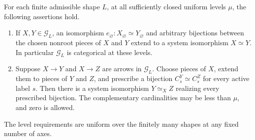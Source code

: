 \begin{theorem}
\label{sys:basis-classification}
For each finite admissible shape $L$, at all sufficiently closed
uniform levels $\mu$, the following assertions hold.
\begin{enumerate}
\item If $X,Y\in\mathcal G_L$, an isomorphism
$e_\varnothing:X_\varnothing\simeq Y_\varnothing$ and arbitrary
bijections between the chosen nonroot pieces of $X$ and $Y$ extend
to a system isomorphism $X\simeq Y$.
In particular $\mathcal G_L$ is categorical at these levels.
\item Suppose $X\to Y$ and $X\to Z$ are arrows in
$\mathcal G_L$.  Choose pieces of $X$, extend them to pieces of
$Y$ and $Z$, and prescribe a bijection
$C_s^Y\simeq C_s^Z$ for every active label $s$.
Then there is a system isomorphism $Y\simeq_X Z$ realizing every
prescribed bijection.  The complementary cardinalities may be
less than $\mu$, and zero is allowed.
\end{enumerate}
The level requirements are uniform over the finitely many shapes
at any fixed number of axes.
\end{theorem}

